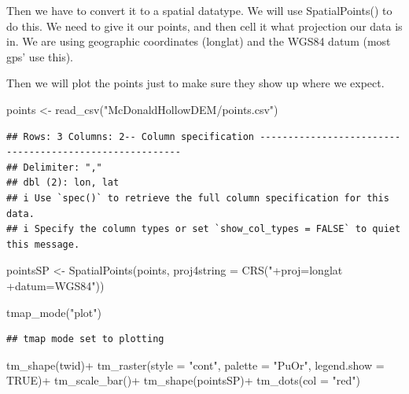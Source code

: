 \documentclass[
]{book}
\newenvironment{Shaded}{\begin{snugshade}}{\end{snugshade}}
\newcommand{\AttributeTok}[1]{\textcolor[rgb]{0.77,0.63,0.00}{#1}}
\newcommand{\ConstantTok}[1]{\textcolor[rgb]{0.00,0.00,0.00}{#1}}
\newcommand{\FunctionTok}[1]{\textcolor[rgb]{0.00,0.00,0.00}{#1}}
\newcommand{\NormalTok}[1]{#1}
\newcommand{\OtherTok}[1]{\textcolor[rgb]{0.56,0.35,0.01}{#1}}
\newcommand{\SpecialCharTok}[1]{\textcolor[rgb]{0.00,0.00,0.00}{#1}}
\newcommand{\StringTok}[1]{\textcolor[rgb]{0.31,0.60,0.02}{#1}}
\begin{document}
Then we have to convert it to a spatial datatype. We will use SpatialPoints() to do this. We need to give it our points, and then cell it what projection our data is in. We are using geographic coordinates (longlat) and the WGS84 datum (most gps' use this).

Then we will plot the points just to make sure they show up where we expect.

\begin{Shaded}
\begin{Highlighting}[]
\NormalTok{points }\OtherTok{\textless{}{-}} \FunctionTok{read\_csv}\NormalTok{(}\StringTok{"McDonaldHollowDEM/points.csv"}\NormalTok{)}
\end{Highlighting}
\end{Shaded}

\begin{verbatim}
## Rows: 3 Columns: 2-- Column specification --------------------------------------------------------
## Delimiter: ","
## dbl (2): lon, lat
## i Use `spec()` to retrieve the full column specification for this data.
## i Specify the column types or set `show_col_types = FALSE` to quiet this message.
\end{verbatim}

\begin{Shaded}
\begin{Highlighting}[]
\NormalTok{pointsSP }\OtherTok{\textless{}{-}} \FunctionTok{SpatialPoints}\NormalTok{(points, }\AttributeTok{proj4string =} \FunctionTok{CRS}\NormalTok{(}\StringTok{"+proj=longlat +datum=WGS84"}\NormalTok{))}

\FunctionTok{tmap\_mode}\NormalTok{(}\StringTok{"plot"}\NormalTok{)}
\end{Highlighting}
\end{Shaded}

\begin{verbatim}
## tmap mode set to plotting
\end{verbatim}

\begin{Shaded}
\begin{Highlighting}[]
\FunctionTok{tm\_shape}\NormalTok{(twid)}\SpecialCharTok{+}
  \FunctionTok{tm\_raster}\NormalTok{(}\AttributeTok{style =} \StringTok{"cont"}\NormalTok{, }\AttributeTok{palette =} \StringTok{"PuOr"}\NormalTok{, }\AttributeTok{legend.show =} \ConstantTok{TRUE}\NormalTok{)}\SpecialCharTok{+}
  \FunctionTok{tm\_scale\_bar}\NormalTok{()}\SpecialCharTok{+}
\FunctionTok{tm\_shape}\NormalTok{(pointsSP)}\SpecialCharTok{+}
  \FunctionTok{tm\_dots}\NormalTok{(}\AttributeTok{col =} \StringTok{"red"}\NormalTok{)}
\end{Highlighting}
\end{Shaded}
\end{document}
